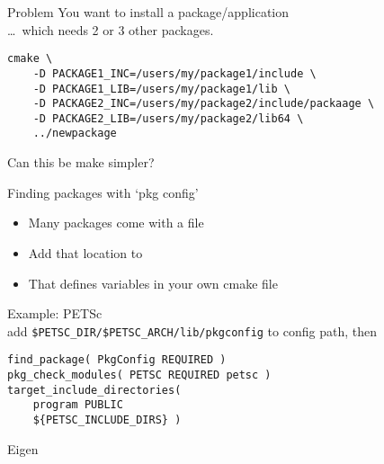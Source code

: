 
\lstset{language=bash}


\begin{numberedframe}{Problem}
  You want to install a package/application\\
  \dots~which needs 2 or 3 other packages.
\lstset{language=Bash}
\begin{lstlisting}
cmake \
    -D PACKAGE1_INC=/users/my/package1/include \ 
    -D PACKAGE1_LIB=/users/my/package1/lib \ 
    -D PACKAGE2_INC=/users/my/package2/include/packaage \ 
    -D PACKAGE2_LIB=/users/my/package2/lib64 \ 
    ../newpackage
\end{lstlisting}
Can this be make simpler?
\end{numberedframe}

\begin{numberedframe}{Finding packages with `pkg config'}
  \begin{itemize}
  \item Many packages come with a  file
  \item Add that location to 
  \item That defines variables in your own cmake file
  \end{itemize}
Example: PETSc\\
add \verb+$PETSC_DIR/$PETSC_ARCH/lib/pkgconfig+ to config path,
then
\begin{lstlisting}
find_package( PkgConfig REQUIRED )
pkg_check_modules( PETSC REQUIRED petsc )
target_include_directories(
	program PUBLIC
	${PETSC_INCLUDE_DIRS} )
\end{lstlisting}
\end{numberedframe}

\begin{numberedframe}{Eigen}
  \lstset{numbers=left,numberstyle=\tiny}
  
\end{numberedframe}


